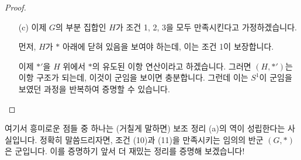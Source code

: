\documentclass[12pt]{paper}
\begin{document}
\begin{proof}
\begin{itemize}
      조건 3이 성립함을 보이기에 앞서 주장 [1]을 증명하겠습니다.
      \begin{enumerate}
        \item[{주장 [1]:}] $x * y = e$를 만족시키는 임의의 $x \in G$와 $y \in G$에 대하여 $y * x = e$이다.
      \end{enumerate}

      \begin{proof}[Proof of the claim]
        $x \in G$와 $y \in G$가 $x * y = e$를 만족시킨다고 가정하겠습니다.
        이때 $z := y * x$로 두고, $z * z = z$를 보이면 충분합니다.
        그 까닭은 양변에 $z^{-1}$을 곱하여 $z = e$를 얻을 수 있기 때문입니다.
        그런데
        \begin{align*}
          z * z
          & = \left( y * x \right) * \left( y * x \right) \\
          & = y * \left( x * \left( y * x \right) \right) \\
          & = y * \left( \left( x * y \right) * x \right) \\
          & = y * \left( e * x \right) \\
          & = y * x \\
          & = z
        \end{align*}
        가 도출되네요.
        이로써 주장 [1]의 증명이 끝났습니다.
      \end{proof}
      
      이제 $H$에서 원소 하나를 뽑아 $a$라고 부르겠습니다.
      그러면 보조 정리 (a)에 의하여 어떤 $b \in H$가 존재하여 $$ a *' b = e \land \left( \forall h \in H \right) \left[ a *' h = e \rightarrow b = h \right]$$가 성립합니다.
      이제 보조 정리 (a)를 군 $ \left( G , * \right) $에 적용하면, 어떤 $x \in G$가 $$ a * x = e \land \left( \forall y \in G \right) \left[ a * y = e \rightarrow x = y \right] $$를 만족시킴을 알 수 있는데,
      $y$에 $b$를 넣음으로써 $x = b$를 얻습니다.
      따라서 $a * b = e$를 얻게 되고, 주장 [1]에 의하여 $b * a = e$를 얻습니다.
      이로써 조건 3의 증명이 끝났습니다.

      \item[(c)] 이제 $G$의 부분 집합인 $H$가 조건 1, 2, 3을 모두 만족시킨다고 가정하겠습니다.
      
      먼저, $H$가 $*$ 아래에 닫혀 있음을 보여야 하는데, 이는 조건 1이 보장합니다.

      이제 $*'$을 $H$ 위에서 $*$의 유도된 이항 연산이라고 하겠습니다.
      그러면 $\left( H , *' \right)$는 이항 구조가 되는데, 이것이 군임을 보이면 충분합니다.
      그런데 이는 $S^1$이 군임을 보였던 과정을 반복하여 증명할 수 있습니다.
    \end{itemize}
  \end{proof}

  여기서 흥미로운 점들 중 하나는 (거칠게 말하면) 보조 정리 (a)의 역이 성립한다는 사실입니다.
  정확히 말씀드리자면, 조건 (10)과 (11)을 만족시키는 임의의 반군 $ \left( G , * \right) $은 군입니다.
  이를 증명하기 앞서 더 재밌는 정리를 증명해 보겠습니다!

  

  
\end{document}
